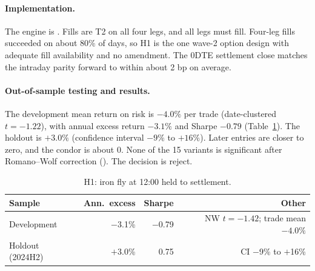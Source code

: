 \documentclass[../main.tex]{subfiles}
\begin{document}
\paragraph{Implementation.}
The engine is . Fills are T2 on all four legs, and all legs must fill. Four-leg fills succeeded on about 80\% of days, so H1 is the one wave-2 option design with adequate fill availability and no amendment. The 0DTE settlement close matches the intraday parity forward to within about 2 bp on average.

\paragraph{Out-of-sample testing and results.}
The development mean return on risk is $-4.0\%$ per trade (date-clustered $t = -1.22$), with annual excess return $-3.1\%$ and Sharpe $-0.79$ (Table~\ref{tab:h1}). The holdout is $+3.0\%$ (confidence interval $-9\%$ to $+16\%$). Later entries are closer to zero, and the condor is about 0. None of the 15 variants is significant after Romano--Wolf correction (). The decision is reject.

\begin{table}[tbp]
\centering\small
\caption{H1: iron fly at 12:00 held to settlement.}\label{tab:h1}
\begin{tabular}{@{}lrrr@{}}
\toprule
Sample & Ann.\ excess & Sharpe & Other \\
\midrule
Development & $-$3.1\% & $-$0.79 & NW $t=-1.42$; trade mean $-4.0\%$ \\
Holdout (2024H2) & $+$3.0\% & 0.75 & CI $-$9\% to $+$16\% \\
\bottomrule
\end{tabular}
\end{table}

\end{document}
